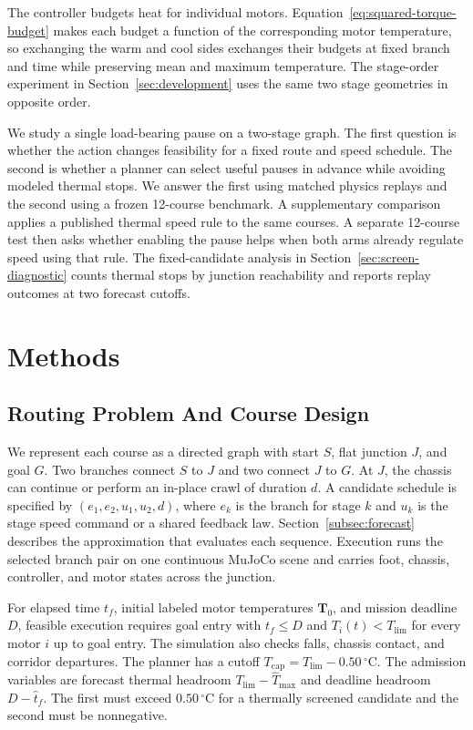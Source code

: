 \documentclass{ieeeaccess}
\begin{document}
The controller budgets heat for individual motors. Equation~\eqref{eq:squared-torque-budget} makes each budget a function of the corresponding motor temperature, so exchanging the warm and cool sides exchanges their budgets at fixed branch and time while preserving mean and maximum temperature. The stage-order experiment in Section~\ref{sec:development} uses the same two stage geometries in opposite order.

We study a single load-bearing pause on a two-stage graph. The first question is whether the action changes feasibility for a fixed route and speed schedule. The second is whether a planner can select useful pauses in advance while avoiding modeled thermal stops. We answer the first using matched physics replays and the second using a frozen 12-course benchmark. A supplementary comparison applies a published thermal speed rule to the same courses. A separate 12-course test then asks whether enabling the pause helps when both arms already regulate speed using that rule. The fixed-candidate analysis in Section~\ref{sec:screen-diagnostic} counts thermal stops by junction reachability and reports replay outcomes at two forecast cutoffs.

\section{Methods}

\subsection{Routing Problem And Course Design}
\label{subsec:routing}

We represent each course as a directed graph with start $S$, flat junction $J$, and goal $G$. Two branches connect $S$ to $J$ and two connect $J$ to $G$. At $J$, the chassis can continue or perform an in-place crawl of duration $d$. A candidate schedule is specified by $(e_1,e_2,u_1,u_2,d)$, where $e_k$ is the branch for stage $k$ and $u_k$ is the stage speed command or a shared feedback law. Section~\ref{subsec:forecast} describes the approximation that evaluates each sequence. Execution runs the selected branch pair on one continuous MuJoCo scene and carries foot, chassis, controller, and motor states across the junction.

For elapsed time $t_f$, initial labeled motor temperatures $\mathbf{T}_0$, and mission deadline $D$, feasible execution requires goal entry with $t_f\leq D$ and $T_i(t)<T_{\mathrm{lim}}$ for every motor $i$ up to goal entry. The simulation also checks falls, chassis contact, and corridor departures. The planner has a cutoff $T_{\mathrm{cap}}=T_{\mathrm{lim}}-0.50\,{}^\circ\mathrm{C}$. The admission variables are forecast thermal headroom $T_{\mathrm{lim}}-\widehat{T}_{\max}$ and deadline headroom $D-\widehat{t}_f$. The first must exceed $0.50\,{}^\circ\mathrm{C}$ for a thermally screened candidate and the second must be nonnegative.
\end{document}
